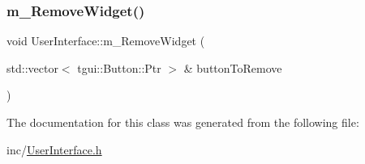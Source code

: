 \subsubsection{\texorpdfstring{m\+\_\+\+Remove\+Widget()}{m\_RemoveWidget()}\hspace{0.1cm}{\footnotesize\ttfamily [2/2]}}
{\footnotesize\ttfamily void User\+Interface\+::m\+\_\+\+Remove\+Widget (\begin{DoxyParamCaption}\item[{std\+::vector$<$ tgui\+::\+Button\+::\+Ptr $>$ \&}]{button\+To\+Remove }\end{DoxyParamCaption})}



The documentation for this class was generated from the following file\+:\begin{DoxyCompactItemize}
\item 
inc/\mbox{\hyperlink{_user_interface_8h}{User\+Interface.\+h}}\end{DoxyCompactItemize}
